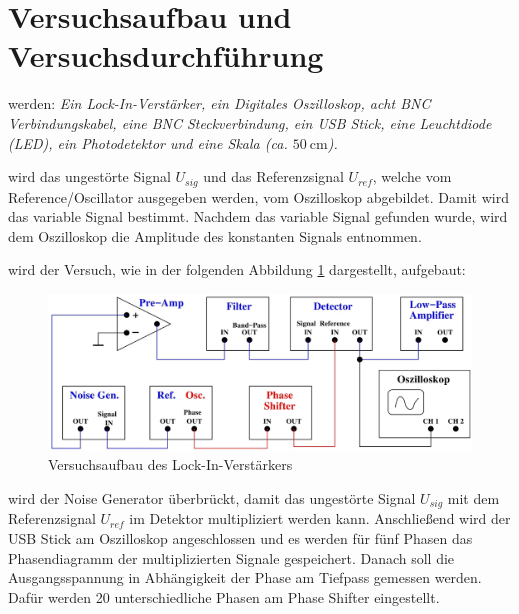 
\section{Versuchsaufbau und Versuchsdurchführung}\justifying \label{sec:4}

\justifying werden: \textit{Ein Lock-In-Verstärker, ein Digitales Oszilloskop, acht BNC Verbindungskabel, eine BNC 
Steckverbindung, ein USB Stick, eine Leuchtdiode (LED), ein Photodetektor und eine Skala (ca. $\SI{50}{\centi\meter}$).}

\justifying wird das ungestörte Signal $U_{sig}$ und das Referenzsignal $U_{ref}$, welche vom Reference/Oscillator ausgegeben werden, 
vom Oszilloskop abgebildet. Damit wird das variable Signal bestimmt. Nachdem das variable Signal gefunden wurde, wird dem Oszilloskop die Amplitude 
des konstanten Signals entnommen. 

\justifying wird der Versuch, wie in der folgenden Abbildung \ref{fig:1} dargestellt, aufgebaut: 

\begin{figure}[H]
    \centering
    \includegraphics[width=\linewidth]{./images/lock-in.jpg}
    \caption{Versuchsaufbau des Lock-In-Verstärkers \cite{V303}}
    \label{fig:1}
\end{figure}

\justifying wird der Noise Generator überbrückt, damit das ungestörte Signal $U_{sig}$ mit dem Referenzsignal $U_{ref}$
im Detektor multipliziert werden kann. Anschließend wird der USB Stick am Oszilloskop angeschlossen und es werden für fünf Phasen das Phasendiagramm 
der multiplizierten Signale gespeichert. Danach soll die Ausgangsspannung in Abhängigkeit der Phase am Tiefpass gemessen werden. Dafür werden 
20 unterschiedliche Phasen am Phase Shifter eingestellt. 

